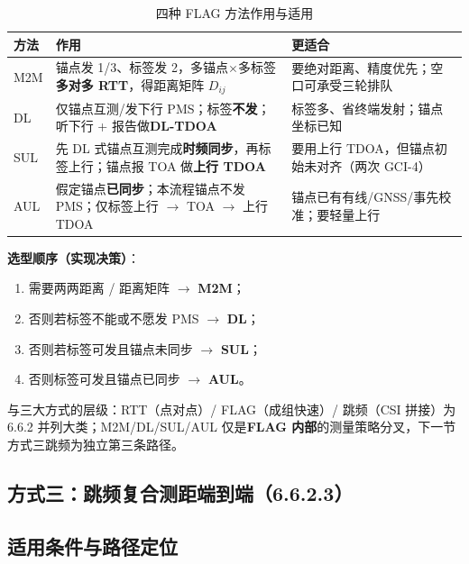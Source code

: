 \documentclass[11pt,a4paper]{ctexart}
\begin{document}
\begin{table}[h]
\centering
\small
\caption{四种 FLAG 方法作用与适用}
\begin{tabular}{L{2cm}L{5.2cm}L{5.5cm}}
\toprule
\textbf{方法} & \textbf{作用} & \textbf{更适合} \\
\midrule
M2M & 锚点发 1/3、标签发 2，多锚点$\times$多标签\textbf{多对多 RTT}，得距离矩阵 $D_{ij}$ & 要绝对距离、精度优先；空口可承受三轮排队 \\
DL & 仅锚点互测/发下行 PMS；标签\textbf{不发}；听下行 + 报告做\textbf{DL-TDOA} & 标签多、省终端发射；锚点坐标已知 \\
SUL & 先 DL 式锚点互测完成\textbf{时频同步}，再标签上行；锚点报 TOA 做\textbf{上行 TDOA} & 要用上行 TDOA，但锚点初始未对齐（两次 GCI-4） \\
AUL & 假定锚点\textbf{已同步}；本流程锚点不发 PMS；仅标签上行 $\rightarrow$ TOA $\rightarrow$ 上行 TDOA & 锚点已有有线/GNSS/事先校准；要轻量上行 \\
\bottomrule
\end{tabular}
\end{table}

\textbf{选型顺序（实现决策）}：
\begin{enumerate}[nosep]
  \item 需要两两距离 / 距离矩阵 $\rightarrow$ \textbf{M2M}；
  \item 否则若标签不能或不愿发 PMS $\rightarrow$ \textbf{DL}；
  \item 否则若标签可发且锚点未同步 $\rightarrow$ \textbf{SUL}；
  \item 否则标签可发且锚点已同步 $\rightarrow$ \textbf{AUL}。
\end{enumerate}

与三大方式的层级：RTT（点对点）/ FLAG（成组快速）/ 跳频（CSI 拼接）为 6.6.2 并列大类；M2M/DL/SUL/AUL 仅是\textbf{FLAG 内部}的测量策略分叉，下一节方式三跳频为独立第三条路径。

\subsection{方式三：跳频复合测距端到端（6.6.2.3）}

\subsection{适用条件与路径定位}
\end{document}
